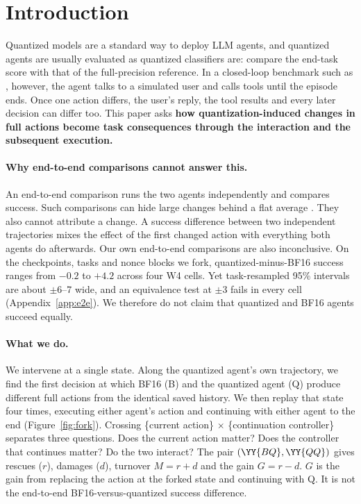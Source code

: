 \section{Introduction}
\label{sec:intro}

Quantized models are a standard way to deploy LLM agents, and quantized agents are usually evaluated as quantized classifiers are: compare the end-task score with that of the full-precision reference. In a closed-loop benchmark such as \tautwo{} \citep{barres2025tau2}, however, the agent talks to a simulated user and calls tools until the episode ends. Once one action differs, the user's reply, the tool results and every later decision can differ too. This paper asks \textbf{how quantization-induced changes in full actions become task consequences through the interaction and the subsequent execution.}

\paragraph{Why end-to-end comparisons cannot answer this.} An end-to-end comparison runs the two agents independently and compares success. Such comparisons can hide large changes behind a flat average \citep{dutta2024accuracy,jang2026flat}. They also cannot attribute a change. A success difference between two independent trajectories mixes the effect of the first changed action with everything both agents do afterwards. Our own end-to-end comparisons are also inconclusive. On the checkpoints, tasks and nonce blocks we fork, quantized-minus-BF16 success ranges from $-0.2$ to $+4.2$\pp{} across four W4 cells. Yet task-resampled 95\% intervals are about $\pm$6--7\pp{} wide, and an equivalence test at $\pm$3\pp{} fails in every cell (Appendix~\ref{app:e2e}). %
We therefore do not claim that quantized and BF16 agents succeed equally.

\paragraph{What we do.} We intervene at a single state. Along the quantized agent's own trajectory, we find the first decision at which BF16 (B) and the quantized agent (Q) produce different full actions from the identical saved history. We then replay that state four times, executing either agent's action and continuing with either agent to the end (Figure~\ref{fig:fork}). Crossing \{current action\} $\times$ \{continuation controller\} separates three questions. Does the current action matter? Does the controller that continues matter? Do the two interact? The pair $(\YY{BQ},\YY{QQ})$ gives rescues ($r$), damages ($d$), turnover $M=r+d$ and the gain $G=r-d$. $G$ is the gain from replacing the action at the forked state and continuing with Q. It is not the end-to-end BF16-versus-quantized success difference.

